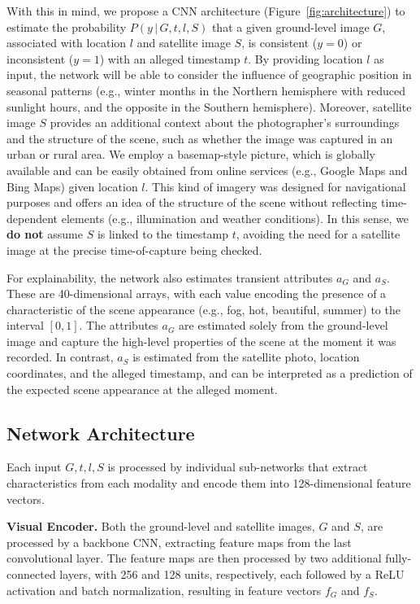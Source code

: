 \documentclass[journal]{IEEEtran}
\begin{document}
    With this in mind, we propose a CNN architecture (Figure~\ref{fig:architecture}) to estimate the probability $P(y\,|\,G, t, l, S)$ that a given ground-level image $G$, associated with location $l$ and satellite image $S$, is consistent ($y=0$) or inconsistent ($y=1$) with an alleged timestamp $t$. By providing location $l$ as input, the network will be able to consider the influence of geographic position in seasonal patterns (e.g., winter months in the Northern hemisphere with reduced sunlight hours, and the opposite in the Southern hemisphere). Moreover,  satellite image $S$ provides an additional context about the photographer's surroundings and the structure of the scene, such as whether the image was captured in an urban or rural area. We employ a basemap-style picture, which is globally available and can be easily obtained from online services (e.g., Google Maps and Bing Maps) given location $l$. This kind of imagery was designed for navigational purposes and offers an idea of the structure of the scene without reflecting time-dependent elements (e.g., illumination and weather conditions). In this sense, we \textbf{do not} assume $S$ is linked to the timestamp $t$, avoiding the need for a satellite image at the precise time-of-capture being checked.
    
    For explainability, the network also estimates transient attributes $a_{\textit{G}}$ and $a_{\textit{S}}$. These are 40-dimensional arrays, with each value encoding the presence of a characteristic of the scene appearance (e.g., fog, hot, beautiful, summer) to the interval $[0,1]$. The attributes $a_{\textit{G}}$ are estimated solely from the ground-level image and capture the high-level properties of the scene at the moment it was recorded. In contrast, $a_{S}$ is estimated from the satellite photo, location coordinates, and the alleged timestamp, and can be interpreted as a prediction of the expected scene appearance at the alleged moment.
    
    \subsection{Network Architecture}
        Each input $G, t, l, S$ is processed by individual sub-networks that extract characteristics from each modality and encode them into 128-dimensional feature vectors. \newline
        
        \noindent\textbf{Visual Encoder.} Both the ground-level and satellite images, $G$ and $S$, are processed by a backbone CNN, extracting feature maps from the last convolutional layer. The feature maps are then processed by two additional fully-connected layers, with 256 and 128 units, respectively, each followed by a ReLU activation and batch normalization, resulting in feature vectors $f_{\textit{G}}$ and $f_{\textit{S}}$. \newline
        
\end{document}
